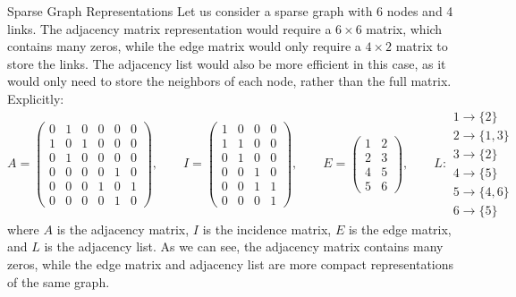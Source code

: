 \begin{example}{Sparse Graph Representations}
    Let us consider a sparse graph with 6 nodes and 4 links. The adjacency matrix representation would require a $6 \times 6$ matrix, which contains many zeros, while the edge matrix would only require a $4 \times 2$ matrix to store the links. The adjacency list would also be more efficient in this case, as it would only need to store the neighbors of each node, rather than the full matrix. Explicitly:
    \[
        A = \begin{pmatrix}
            0 & 1 & 0 & 0 & 0 & 0 \\
            1 & 0 & 1 & 0 & 0 & 0 \\
            0 & 1 & 0 & 0 & 0 & 0 \\
            0 & 0 & 0 & 0 & 1 & 0 \\
            0 & 0 & 0 & 1 & 0 & 1 \\
            0 & 0 & 0 & 0 & 1 & 0
        \end{pmatrix}, \qquad I = \begin{pmatrix}
            1 & 0 & 0 & 0 \\
            1 & 1 & 0 & 0 \\
            0 & 1 & 0 & 0 \\
            0 & 0 & 1 & 0 \\
            0 & 0 & 1 & 1 \\
            0 & 0 & 0 & 1
        \end{pmatrix}, \qquad E = \begin{pmatrix}
            1 & 2 \\
            2 & 3 \\
            4 & 5 \\
            5 & 6
        \end{pmatrix}, \qquad L : \begin{array}{l}
            1 \rightarrow \{2\}    \\
            2 \rightarrow \{1, 3\} \\
            3 \rightarrow \{2\}    \\
            4 \rightarrow \{5\}    \\
            5 \rightarrow \{4, 6\} \\
            6 \rightarrow \{5\}
        \end{array}
    \]
    where $A$ is the adjacency matrix, $I$ is the incidence matrix, $E$ is the edge matrix, and $L$ is the adjacency list. As we can see, the adjacency matrix contains many zeros, while the edge matrix and adjacency list are more compact representations of the same graph.
\end{example}


